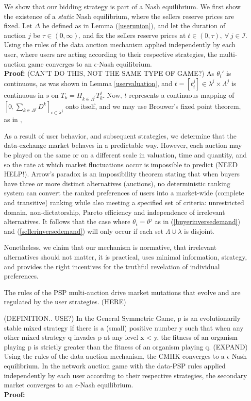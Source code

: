 \documentclass[sigconf, anonymous]{acmart}
\newcommand{\mcI}{\mathcal{I}}
\theoremstyle{definition}
\begin{document}
We show that our bidding strategy is
part of a Nash equilibrium. We first show the existence of a \emph{static} Nash
equilibrium, where the sellers reserve prices are fixed.
{
Let $\Delta$ be defined as in Lemma (\ref{userunion}), and
let the duration of auction $j$ be $\tau \in (0,\infty)$, and fix the
sellers reserve prices at $t\in(0,\tau), \ \forall \ j\in\mcI$.
Using the rules of the data auction mechanism applied independently by each
user, where users are acting according to their respective strategies, the multi-auction game converges to an $\epsilon$-Nash equilibrium. 
}\\
\textbf{Proof:}
(CAN'T DO THIS, NOT THE SAME TYPE OF GAME?)
As $\theta_i'$ is continuous, as was shown in Lemma \ref{uservaluation}, and
$t=[t_i^j] \in \lambda^j \times \Lambda^j$ is continuous in $s$ on
$T_k=\Pi_{k\in\Lambda^j} T_k^j$. Now, $t$
represents a continuous mapping of $[0,\sum_{k\in\Lambda^j} D^k]_{i\in\lambda^j}$ onto itself,
and we may use Brouwer's fixed point theorem, as in \cite{semret},


As a result of user behavior, and subsequent strategies, we determine that the
data-exchange market behaves in a predictable way. However,
each auction may be played on the same or on a different scale in
valuation, time and quantity, and so the rate at which market fluctuations occur is
impossible to predict (NEED HELP!). 
Arrow's paradox is an impossibility theorem stating that when buyers have three
or more distinct alternatives (auctions), no deterministic ranking system can
convert the ranked preferences of users into a market-wide (complete
and transitive) ranking while also meeting a specified set of criteria:
unrestricted domain, non-dictatorship, Pareto efficiency and independence of
irrelevant alternatives. It follows that the case where
$\theta_i = \theta^j$ as in (\ref{buyerinversedemand}) and
(\ref{sellerinversedemand}) will only occur if each set $\Lambda \cup \lambda$
is disjoint.

Nonetheless, we claim that our mechanism is normative, that irrelevant
alternatives should not matter, it is practical, uses minimal information,
strategy, and provides the right incentives for the truthful revelation of individual preferences. 

The rules of the PSP
multi-auction drive market mutations that evolve and are regulated by the user
strategies.
(HERE)

(DEFINITION.. USE?)
In the General Symmetric Game, p is an evolutionarily stable mixed strategy if
there is a (small) positive number y such that when any other mixed strategy q
invades p at any level x < y, the fitness of an organism playing p is strictly
greater than the fitness of an organism playing q.
(EXPAND)
{
Using the rules of the data auction mechanism, the CMHK
\cite{zheng} converges to a $\epsilon$-Nash equilibrium. In the network auction
game with the data-PSP rules applied independently by each user according to their respective strategies, the secondary market converges to an $\epsilon$-Nash
equilibrium. 
}\\
\textbf{Proof:}
\end{document}
